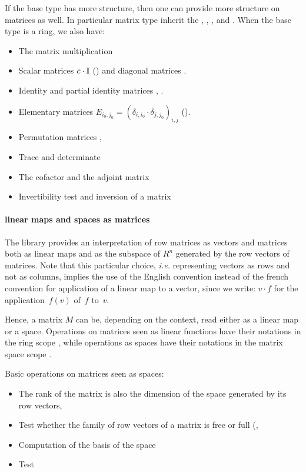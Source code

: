 If the base type has more structure, then one can provide more
structure on matrices as well. In particular matrix type inherit the
, , ,  and
. When the base type is a ring, we also have:
\begin{itemize}
\item The matrix multiplication \C{_ * _}
\item Scalar matrices $c\cdot \mathbb{I}$ () and diagonal matrices
  .
\item Identity  and partial identity matrices ,
  .
\item Elementary matrices
  $E_{i_0,j_0} = \left(\delta_{i,i_0}\cdot\delta_{j,j_0}\right)_{i,j}$
  ().
\item Permutation matrices , 
\item Trace  and determinate 
\item The cofactor  and the adjoint matrix
\item Invertibility test  and inversion of a matrix
\end{itemize}

\paragraph{linear maps and spaces as matrices}

The library  provides an interpretation of row
matrices as vectors and matrices both as linear maps and as the
subspace of $R^n$ generated by the row vectors of matrices. Note that
this particular choice, \textit{i.e.} representing vectors as rows and
not as columns, implies the use of the English convention instead of
the french convention for application of a linear map to a
vector, since we write: $v \cdot f$ for the application~$f(v)$ of~$f$
to~$v$.

Hence, a matrix $M$ can be, depending on the context, read either as a
linear map or a space. Operations on matrices seen as linear
functions have their notations in the ring scope , while
operations as spaces have their notations in the matrix space scope
.

Basic operations on matrices seen as spaces:
\begin{itemize}
\item The rank of the matrix is also the dimension of the space
  generated by its row vectors, 
\item Test whether the family of row vectors of a matrix is free or
  full (, 
\item Computation of the basis of the space
\item Test
\end{itemize}

